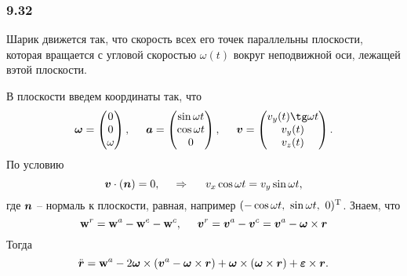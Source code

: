 \subsubsection*{9.32}

Шарик движется так, что скорость всех его точек параллельны плоскости, которая вращается с угловой скоростью $\omega(t)$ вокруг неподвижной оси, лежащей вэтой плоскости. 

В плоскости введем координаты так, что
$$
    \vc{\omega} = \begin{pmatrix}
        0 \\ 0 \\ \omega
    \end{pmatrix},
    \hspace{0.5cm} 
    \vc{a} = \begin{pmatrix}
        \sin \omega t \\
        \cos \omega t \\
        0
    \end{pmatrix}, \hspace{0.5cm} 
    \vc{v} = \begin{pmatrix}
        v_y (t) \tg \omega t \\
        v_y(t) \\
        v_z (t) \\
    \end{pmatrix}.
$$
По условию 
$$\mbox{\boldmath $v$} \cdot (\mbox{\boldmath $n$}) = 0,
\hspace{0.5cm} \Rightarrow \hspace{0.5cm} 
v_x \cos \omega t = v_y \sin \omega t,
$$
где $\mbox{\boldmath $n$}$ -- нормаль к плоскости, равная, например $
(-\cos \omega t, \ \sin \omega t, \ 0)\T
$.
Знаем, что
\begin{equation}
    \mbox{\boldmath $\mathrm{w}$}^r = \mbox{\boldmath $\mathrm{w}$}^a - \mbox{\boldmath $\mathrm{w}$}^e - \mbox{\boldmath $\mathrm{w}$}^c,
    \hspace{0.5cm} 
    \mbox{\boldmath $v$}^r = \mbox{\boldmath $v$}^a - \mbox{\boldmath $v$}^c = \mbox{\boldmath $v$}^a - \mbox{\boldmath $\omega$}\times \mbox{\boldmath $r$}
\end{equation}
Тогда
\begin{equation}
    \ddot{\mbox{\boldmath $r$}} = \mbox{\boldmath $\mathrm{w}$}^a - 2 \mbox{\boldmath $\omega$}\times
    (\mbox{\boldmath $v$}^a - \mbox{\boldmath $\omega$}\times \mbox{\boldmath $r$}) + \mbox{\boldmath $\omega$} \times \left(\mbox{\boldmath $\omega$} \times \mbox{\boldmath $r$}\right) + \mbox{\boldmath $\varepsilon$} \times \mbox{\boldmath $r$}.
\end{equation}